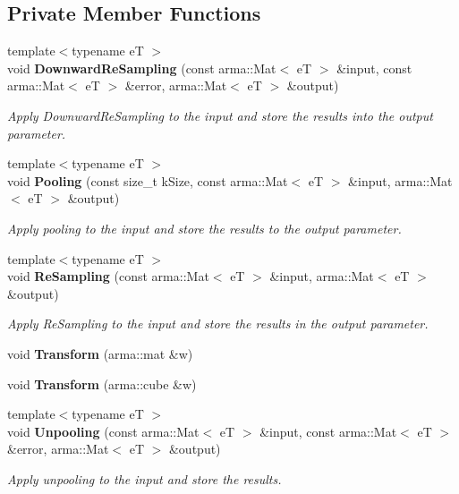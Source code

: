 \subsection*{Private Member Functions}
\begin{DoxyCompactItemize}
\item 
{\footnotesize template$<$typename eT $>$ }\\void {\bf Downward\+Re\+Sampling} (const arma\+::\+Mat$<$ eT $>$ \&input, const arma\+::\+Mat$<$ eT $>$ \&error, arma\+::\+Mat$<$ eT $>$ \&output)
\begin{DoxyCompactList}\small\item\em Apply Downward\+Re\+Sampling to the input and store the results into the output parameter. \end{DoxyCompactList}\item 
{\footnotesize template$<$typename eT $>$ }\\void {\bf Pooling} (const size\+\_\+t k\+Size, const arma\+::\+Mat$<$ eT $>$ \&input, arma\+::\+Mat$<$ eT $>$ \&output)
\begin{DoxyCompactList}\small\item\em Apply pooling to the input and store the results to the output parameter. \end{DoxyCompactList}\item 
{\footnotesize template$<$typename eT $>$ }\\void {\bf Re\+Sampling} (const arma\+::\+Mat$<$ eT $>$ \&input, arma\+::\+Mat$<$ eT $>$ \&output)
\begin{DoxyCompactList}\small\item\em Apply Re\+Sampling to the input and store the results in the output parameter. \end{DoxyCompactList}\item 
void {\bf Transform} (arma\+::mat \&w)
\item 
void {\bf Transform} (arma\+::cube \&w)
\item 
{\footnotesize template$<$typename eT $>$ }\\void {\bf Unpooling} (const arma\+::\+Mat$<$ eT $>$ \&input, const arma\+::\+Mat$<$ eT $>$ \&error, arma\+::\+Mat$<$ eT $>$ \&output)
\begin{DoxyCompactList}\small\item\em Apply unpooling to the input and store the results. \end{DoxyCompactList}\end{DoxyCompactItemize}
